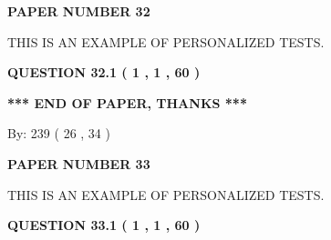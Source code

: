 \documentclass[12pt]{article}
\begin{document}
   
   
   
 {\textbf{ \Large{ PAPER NUMBER           32  }}}
   
   
\vspace{0.2in}
   
   
   
   
   
   
 \vspace{0.2in}
{\Huge  THIS IS AN EXAMPLE OF}
{\Huge  PERSONALIZED TESTS. }
   
   
  
\vspace{0.2in}
  
{\textbf{\Large{QUESTION
32.1 
 (           1 ,           1 ,          60 )
}}}
  
  
 
 

 
 
   
   
 \vspace{0.2in}
 
   
   
   
   
\vspace{1.0in} 
{\textbf{\large{ *** END OF PAPER, THANKS *** }}} 
   
   
\hspace{1.0in} By: 
         239 (          26 ,           34 )
   
   
   
   
\newpage 
\setcounter{page}{ 
    33001 } 
   
   
   
   
 {\textbf{ \Large{ PAPER NUMBER           33  }}}
   
   
\vspace{0.2in}
   
   
   
   
   
   
 \vspace{0.2in}
{\Huge  THIS IS AN EXAMPLE OF}
{\Huge  PERSONALIZED TESTS. }
   
   
  
\vspace{0.2in}
  
{\textbf{\Large{QUESTION
33.1 
 (           1 ,           1 ,          60 )
}}}
  
\end{document}
